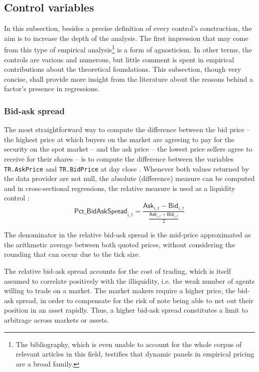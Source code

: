 \subsection{Control variables}
In this subsection, besides a precise definition of every control's construction, the aim is to increase the depth of the analysis. The first impression that may come from this type of empirical analysis\footnote{The bibliography, which is even unable to account for the whole corpus of relevant articles in this field, testifies that dynamic panels in empirical pricing are a broad family.} is a form of agnosticism. In other terms, the controls are various and numerous, but little comment is spent in empirical contributions about the theoretical foundations. This subsection, though very concise, shall provide more insight from the literature about the reasons behind a factor's presence in regressions.
\subsubsection{Bid-ask spread}
The most straightforward way to compute the difference between the bid price -- the highest price at which buyers on the market are agreeing to pay for the security on the spot market -- and the ask price -- the lowest price sellers agree to receive for their shares -- is to compute the difference between the variables \texttt{TR.AskPrice} and \texttt{TR.BidPrice} at day close . Whenever both values returned by the data provider are not null, the absolute (difference) measure can be computed and in cross-sectional regressions, the relative measure is used as a liquidity control :
\begin{equation}
  \mathsf{Pct\_BidAskSpread}_{i, t} = \frac{\mathsf{Ask}_{i, t} - \mathsf{Bid}_{i, t}}{\frac{\mathsf{Ask}_{i, t} + \mathsf{Bid}_{i, t}}{2}}
\end{equation}

The denominator in the relative bid-ask spread is the mid-price approximated as the arithmetic average between both quoted prices, without considering the rounding that can occur due to the tick size.

The relative bid-ask spread accounts for the cost of trading, which is itself assumed to correlate positively with the illiquidity, i.e. the weak number of agents willing to trade on a market. The market makers require a higher price, the bid-ask spread, in order to compensate for the risk of note being able to net out their position in an asset rapidly. Thus, a higher bid-ask spread constitutes a limit to arbitrage across markets or assets.

